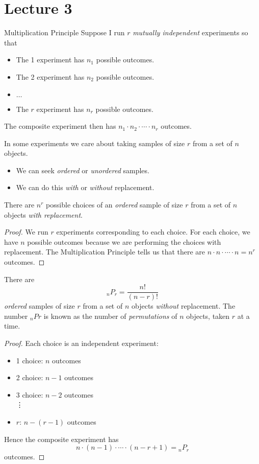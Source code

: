 \documentclass[class=article, crop=false]{standalone}
\begin{document}
  \section{Lecture 3}
  \begin{theorem}{Multiplication Principle}
    Suppose I run $r$ \emph{mutually independent} experiments so that
    \begin{itemize}
      \item The 1 experiment has $n_1$ possible outcomes.
      \item The 2 experiment has $n_2$ possible outcomes.
      \item $\dotsc$
      \item The $r$ experiment has $n_r$ possible outcomes.
    \end{itemize}
    The composite experiment then has $n_1\cdot n_2\cdot \dotsb\cdot n_r$ outcomes.
  \end{theorem}
  In some experiments we care about taking samples of size $r$ from a set of $n$ objects.
  \begin{itemize}
    \item We can seek \emph{ordered} or \emph{unordered} samples.
    \item We can do this \emph{with} or \emph{without} replacement.
  \end{itemize}
  \begin{theorem}{}
    There are $n^r$ possible choices of an \emph{ordered} sample of size $r$ from a set of $n$ objects \emph{with replacement}.
    \begin{proof}
      We run $r$ experiments corresponding to each choice. For each choice, we have $n$ possible outcomes because we are performing the choices with replacement. The Multiplication Principle tells us that there are $n\cdot n\cdot \dotsb\cdot n = n^r$ outcomes.
    \end{proof}
  \end{theorem}
  \begin{theorem}{}
    There are
    \[
      \phantom{}_nP_r = \frac{n!}{(n - r)!}
    \]
    \emph{ordered} samples of size $r$ from a set of $n$ objects \emph{without} replacement. The number $_nPr$ is known as the number of \emph{permutations} of $n$ objects, taken $r$ at a time.
    \begin{proof}
      Each choice is an independent experiment:
      \begin{itemize}
        \item 1 choice: $n$ outcomes
        \item 2 choice: $n - 1$ outcomes
        \item 3 choice: $n - 2$ outcomes \\
        \vdots
        \item $r$: $n - (r - 1)$ outcomes
      \end{itemize}
      Hence the composite experiment has
      \[
        n\cdot (n - 1)\cdot \dotsb\cdot (n - r + 1) = \phantom{}_nP_r
      \]
      outcomes.
    \end{proof}
  \end{theorem}
\end{document}
